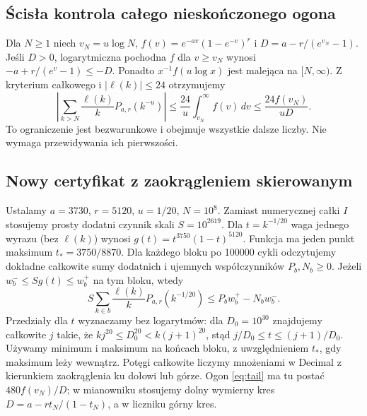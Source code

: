 \documentclass[11pt,a4paper]{article}
\theoremstyle{definition}\newtheorem{defn}[tw]{Definicja}
\theoremstyle{remark}\newtheorem*{uw}{Uwaga}
\begin{document}
\subsection{Ścisła kontrola całego nieskończonego ogona}
Dla $N\ge1$ niech $v_N=u\log N$, $f(v)=e^{-av}(1-e^{-v})^r$ i
$D=a-r/(e^{v_N}-1)$. Jeśli $D>0$, logarytmiczna pochodna $f$ dla $v\ge v_N$
wynosi $-a+r/(e^v-1)\le-D$. Ponadto $x^{-1}f(u\log x)$ jest malejąca
na $[N,\infty)$. Z kryterium całkowego i $|\ell(k)|\le24$ otrzymujemy
\begin{equation}\label{eq:tail}
 \left|\sum_{k>N}\frac{\ell(k)}k P_{a,r}(k^{-u})\right|
 \le\frac{24}{u}\int_{v_N}^\infty f(v)\,dv
 \le\frac{24 f(v_N)}{uD}.
\end{equation}
To ograniczenie jest bezwarunkowe i obejmuje wszystkie dalsze liczby.
Nie wymaga przewidywania ich pierwszości.

\subsection{Nowy certyfikat z zaokrągleniem skierowanym}
Ustalamy $a=3730$, $r=5120$, $u=1/20$, $N=10^8$. Zamiast numerycznej
całki $I$ stosujemy prosty dodatni czynnik skali $S=10^{2619}$.
Dla $t=k^{-1/20}$ waga jednego wyrazu (bez $\ell(k)$) wynosi
$g(t)=t^{3750}(1-t)^{5120}$. Funkcja ma jeden punkt maksimum
$t_*=3750/8870$. Dla każdego bloku po 100000 cykli odczytujemy dokładne
całkowite sumy dodatnich i ujemnych współczynników $P_b,N_b\ge0$.
Jeżeli $w_b^-\le Sg(t)\le w_b^+$ na tym bloku, wtedy
\[
 S\sum_{k\in b}\frac{\ell(k)}k P_{a,r}(k^{-1/20})
 \le P_bw_b^+-N_bw_b^-.
\]
Przedziały dla $t$ wyznaczamy bez logarytmów: dla $D_0=10^{30}$
znajdujemy całkowite $j$ takie, że $kj^{20}\le D_0^{20}<k(j+1)^{20}$,
stąd $j/D_0\le t\le(j+1)/D_0$. Używamy minimum i maksimum na końcach
bloku, z uwzględnieniem $t_*$, gdy maksimum leży wewnątrz. Potęgi całkowite
liczymy mnożeniami w Decimal z kierunkiem zaokrąglenia ku dołowi lub górze.
Ogon \eqref{eq:tail} ma tu postać $480 f(v_N)/D$; w mianowniku stosujemy
dolny wymierny kres $D=a-r t_N/(1-t_N)$, a w liczniku górny kres.
\end{document}
